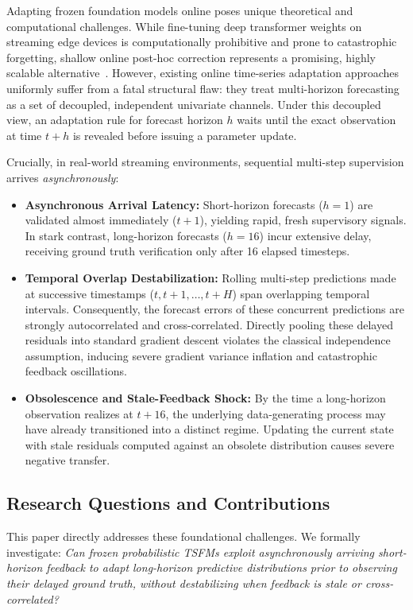 \documentclass[10pt,journal,compsoc]{IEEEtran}
\begin{document}
Adapting frozen foundation models online poses unique theoretical and computational challenges. While fine-tuning deep transformer weights on streaming edge devices is computationally prohibitive and prone to catastrophic forgetting, shallow online post-hoc correction represents a promising, highly scalable alternative~\cite{zantedeschi2023cumulants}. However, existing online time-series adaptation approaches uniformly suffer from a fatal structural flaw: they treat multi-horizon forecasting as a set of decoupled, independent univariate channels. Under this decoupled view, an adaptation rule for forecast horizon $h$ waits until the exact observation at time $t+h$ is revealed before issuing a parameter update.

Crucially, in real-world streaming environments, sequential multi-step supervision arrives \emph{asynchronously}:
\begin{itemize}
    \item \textbf{Asynchronous Arrival Latency:} Short-horizon forecasts ($h=1$) are validated almost immediately ($t+1$), yielding rapid, fresh supervisory signals. In stark contrast, long-horizon forecasts ($h=16$) incur extensive delay, receiving ground truth verification only after 16 elapsed timesteps.
    \item \textbf{Temporal Overlap Destabilization:} Rolling multi-step predictions made at successive timestamps ($t, t+1, \dots, t+H$) span overlapping temporal intervals. Consequently, the forecast errors of these concurrent predictions are strongly autocorrelated and cross-correlated. Directly pooling these delayed residuals into standard gradient descent violates the classical independence assumption, inducing severe gradient variance inflation and catastrophic feedback oscillations.
    \item \textbf{Obsolescence and Stale-Feedback Shock:} By the time a long-horizon observation realizes at $t+16$, the underlying data-generating process may have already transitioned into a distinct regime. Updating the current state with stale residuals computed against an obsolete distribution causes severe negative transfer.
\end{itemize}

\subsection{Research Questions and Contributions}
This paper directly addresses these foundational challenges. We formally investigate: \emph{Can frozen probabilistic TSFMs exploit asynchronously arriving short-horizon feedback to adapt long-horizon predictive distributions prior to observing their delayed ground truth, without destabilizing when feedback is stale or cross-correlated?}
\end{document}
